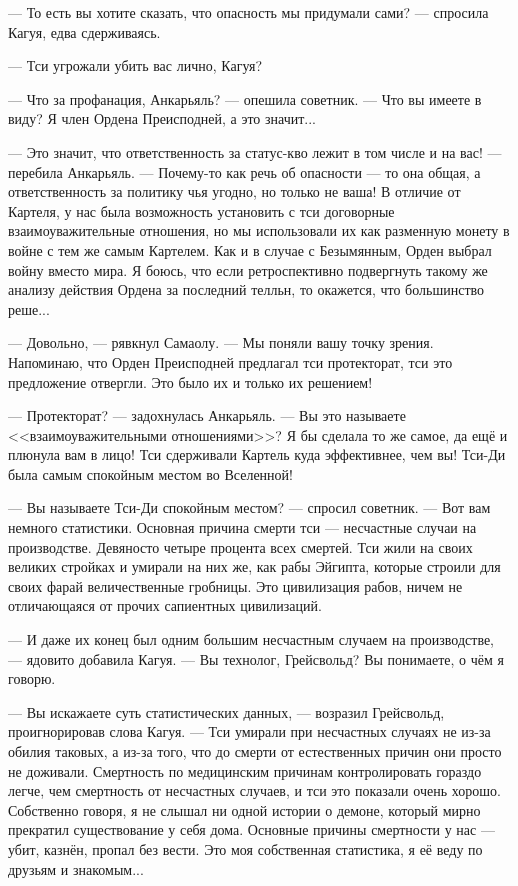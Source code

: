 --- То есть вы хотите сказать, что опасность мы придумали сами? --- спросила Кагуя, едва сдерживаясь.

--- Тси угрожали убить вас лично, Кагуя?

--- Что за профанация, Анкарьяль? --- опешила советник.
--- Что вы имеете в виду?
Я член Ордена Преисподней, а это значит...

--- Это значит, что ответственность за статус-кво лежит в том числе и на вас! --- перебила Анкарьяль.
--- Почему-то как речь об опасности --- то она общая, а ответственность за политику чья угодно, но только не ваша!
В отличие от Картеля, у нас была возможность установить с тси договорные взаимоуважительные отношения, но мы использовали их как разменную монету в войне с тем же самым Картелем.
Как и в случае с Безымянным, Орден выбрал войну вместо мира.
Я боюсь, что если ретроспективно подвергнуть такому же анализу действия Ордена за последний телльн, то окажется, что большинство реше...

--- Довольно, --- рявкнул Самаолу.
--- Мы поняли вашу точку зрения.
Напоминаю, что Орден Преисподней предлагал тси протекторат, тси это предложение отвергли.
Это было их и только их решением!

--- Протекторат? --- задохнулась Анкарьяль.
--- Вы это называете <<взаимоуважительными отношениями>>?
Я бы сделала то же самое, да ещё и плюнула вам в лицо!
Тси сдерживали Картель куда эффективнее, чем вы!
Тси-Ди была самым спокойным местом во Вселенной!

--- Вы называете Тси-Ди спокойным местом? --- спросил советник.
--- Вот вам немного статистики. Основная причина смерти тси --- несчастные случаи на производстве.
Девяносто четыре процента всех смертей.
Тси жили на своих великих стройках и умирали на них же, как рабы Эйгипта, которые строили для своих фарай величественные гробницы.
Это цивилизация рабов, ничем не отличающаяся от прочих сапиентных цивилизаций.

--- И даже их конец был одним большим несчастным случаем на производстве, --- ядовито добавила Кагуя.
--- Вы технолог, Грейсвольд?
Вы понимаете, о чём я говорю.

--- Вы искажаете суть статистических данных, --- возразил Грейсвольд, проигнорировав слова Кагуя.
--- Тси умирали при несчастных случаях не из-за обилия таковых, а из-за того, что до смерти от естественных причин они просто не доживали.
Смертность по медицинским причинам контролировать гораздо легче, чем смертность от несчастных случаев, и тси это показали очень хорошо.
Собственно говоря, я не слышал ни одной истории о демоне, который мирно прекратил существование у себя дома.
Основные причины смертности у нас --- убит, казнён, пропал без вести.
Это моя собственная статистика, я её веду по друзьям и знакомым...


